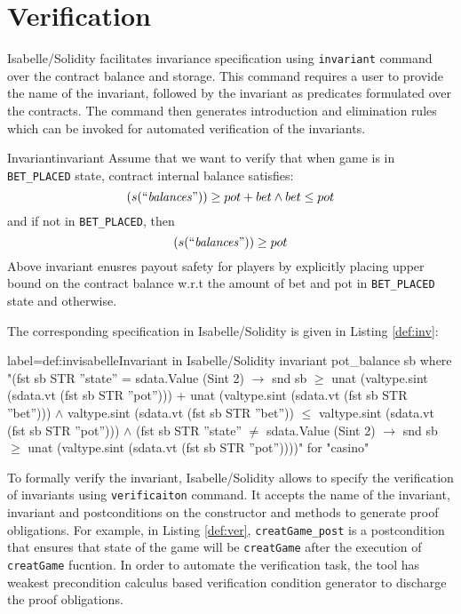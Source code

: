 \documentclass[a4paper,UKenglish,cleveref, autoref, thm-restate]{oasics-v2021}
\begin{document}
\section{Verification}
%
%
%
Isabelle/Solidity facilitates invariance specification using \texttt{\color{isarblue}invariant} command over the contract balance and storage.
%
This command requires a user to provide the name of the invariant, followed by the invariant as predicates formulated over the contracts. The command then generates introduction and elimination rules which can be invoked for automated verification of the invariants.
%
\begin{Example}{Invariant}{invariant}
	Assume that we want to verify that when game is in  \texttt{BET\_PLACED} state, contract internal balance satisfies:
	\begin{equation}
		(s(\text{``$\mathit{balances}$''})) \ge pot + bet  \wedge bet \leq pot
	\end{equation}\label{eq:inv}
	and if not in \texttt{BET\_PLACED}, then 
\begin{equation}
		(s(\text{``$\mathit{balances}$''})) \ge pot 
	\end{equation}\label{eq:inv1}
Above invariant enusres payout safety for players by explicitly placing upper bound on the contract balance w.r.t the amount of bet and pot  in  \texttt{BET\_PLACED} state and otherwise.
%

%
The corresponding specification in Isabelle/Solidity is given in Listing \ref{def:inv}:
\begin{code}{label={def:inv}}{isabelle}{Invariant in Isabelle/Solidity}
invariant pot_balance sb where
    "(fst sb STR ''state'' = sdata.Value (Sint 2)
      $\longrightarrow$ snd sb $\geq$ unat (valtype.sint (sdata.vt (fst sb STR ''pot''))) 
		+ unat (valtype.sint (sdata.vt (fst sb STR ''bet'')))
        $\wedge$ valtype.sint (sdata.vt (fst sb STR ''bet'')) $\leq$ 
		valtype.sint (sdata.vt (fst sb STR ''pot''))) $\wedge$
    (fst sb STR ''state'' $\neq$ sdata.Value (Sint 2)
    $\longrightarrow$  snd sb $\geq$ unat (valtype.sint (sdata.vt (fst sb STR ''pot''))))"
  for "casino"
\end{code}
\end{Example}
%

%
To formally verify the invariant, Isabelle/Solidity allows to specify the verification of invariants using \texttt{\color{isarblue}verificaiton} command. 
%
It accepts the name of the invariant, invariant and postconditions on the constructor and methods to generate proof obligations. 
%
For example, in Listing \ref{def:ver}, \texttt{creatGame\_post} is a postcondition that ensures that state of the game will be \texttt{creatGame} after the execution of \texttt{creatGame} fucntion.
%
In order to automate the verification task, the tool has weakest precondition calculus based verification condition generator to discharge the proof obligations.
\end{document}
